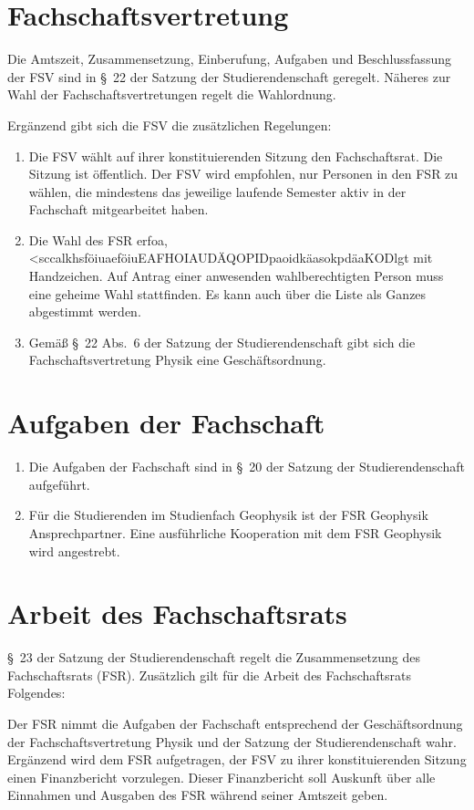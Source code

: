 \documentclass[
	a4paper,
	12pt,
	oneside,
	parskip=half-,
	pagesize,
	headsepline,
	german,
	ngerman
]{scrartcl}
\begin{document}
\section{Fachschaftsvertretung}
Die Amtszeit, Zusammensetzung, Einberufung, Aufgaben und Beschlussfassung der FSV sind in §~22 der Satzung der Studierendenschaft geregelt. Näheres zur Wahl der Fachschaftsvertretungen regelt die Wahlordnung.

Ergänzend gibt sich die FSV die zusätzlichen Regelungen:
\begin{enumerate}
	\item Die FSV wählt auf ihrer konstituierenden Sitzung den Fachschaftsrat. Die Sitzung ist öffentlich. Der FSV wird empfohlen, nur Personen in den FSR zu wählen, die mindestens das jeweilige laufende Semester aktiv in der Fachschaft mitgearbeitet haben.
	\item Die Wahl des FSR erfoa,<sccalkhsföiuaeföiuEAFHOIAUDÄQOPIDpaoidkäasokpdäaKODlgt mit Handzeichen. Auf Antrag einer anwesenden wahlberechtigten Person muss eine geheime Wahl stattfinden. Es kann auch über die Liste als Ganzes abgestimmt werden.
	\item Gemäß §~22 Abs.~6 der Satzung der Studierendenschaft gibt sich die Fachschaftsvertretung Physik eine Geschäftsordnung.
\end{enumerate}

\section{Aufgaben der Fachschaft}
\begin{enumerate}
	\item Die Aufgaben der Fachschaft sind in §~20 der Satzung der Studierendenschaft aufgeführt.
	\item Für die Studierenden im Studienfach Geophysik ist der FSR Geophysik Ansprechpartner. Eine ausführliche Kooperation mit dem FSR Geophysik wird angestrebt.
\end{enumerate}

\section{Arbeit des Fachschaftsrats}
§~23 der Satzung der Studierendenschaft regelt die Zusammensetzung des Fachschaftsrats (FSR). Zusätzlich gilt für die Arbeit des Fachschaftsrats Folgendes:

Der FSR nimmt die Aufgaben der Fachschaft entsprechend der Geschäftsordnung der Fachschaftsvertretung Physik und der Satzung der Studierendenschaft wahr. Ergänzend wird dem FSR aufgetragen, der FSV zu ihrer konstituierenden Sitzung einen Finanzbericht vorzulegen. Dieser Finanzbericht soll Auskunft über alle Einnahmen und Ausgaben des FSR während seiner Amtszeit geben.
\end{document}
